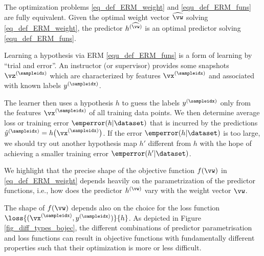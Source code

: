\documentclass[12pt]{report}
\begin{document}
The optimization problems \eqref{eq_def_ERM_weight} and \eqref{equ_def_ERM_funs} 
are fully equivalent. Given the optimal weight vector $\widehat{\vw}$ solving 
\eqref{eq_def_ERM_weight}, the predictor $h^{(\widehat{\vw})}$ is 
an optimal predictor solving \eqref{equ_def_ERM_funs}. 

Learning a hypothesis via ERM \eqref{equ_def_ERM_funs} is a form of 
learning by ``trial and error''. An instructor (or supervisor) provides some 
snapshots $\vz^{(\sampleidx)}$ which are characterized by features 
$\vx^{(\sampleidx)}$ and associated with known labels $y^{(\sampleidx)}$. 

The learner then uses a hypothesis $h$ to guess the labels $y^{(\sampleidx)}$ 
only from the features $\vx^{(\sampleidx)}$ of all training data points. We then 
determine average loss or training error $\emperror(h|\dataset)$ that is incurred 
by the predictions $\hat{y}^{(\sampleidx)} = h\big( \vx^{(\sampleidx)} \big)$. 
If the error $\emperror(h|\dataset)$ is too large, we should try out another  
hypothesis map $h'$ different from $h$ with the hope of achieving a smaller 
training error $\emperror(h'|\dataset)$. 

%

We highlight that the precise shape of the objective function 
$f(\vw)$ in \eqref{eq_def_ERM_weight} depends heavily on the 
parametrization of the predictor functions, i.e., how does the 
predictor $h^{(\vw)}$ vary with the weight vector $\vw$. 

The shape of $f(\vw)$ depends also on the choice for the loss 
function $\loss{(\vx^{(\sampleidx)},y^{(\sampleidx)})}{h}$. As 
depicted in Figure \ref{fig_diff_types_bojec}, the different combinations 
of predictor parametrisation and loss functions can result in objective 
functions with fundamentally different properties such that their 
optimization is more or less difficult. 
\end{document}
